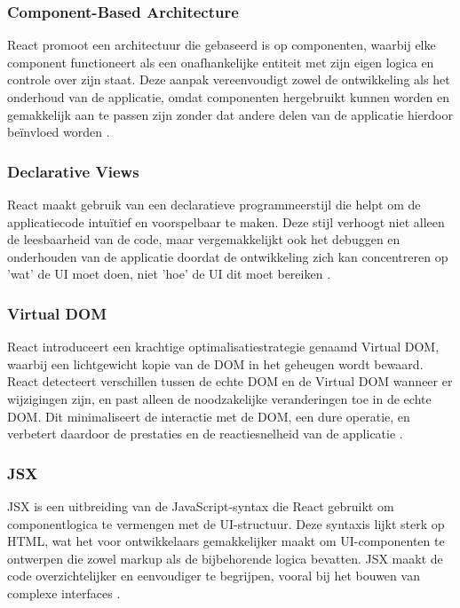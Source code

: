 \subsubsection{Component-Based Architecture}
React promoot een architectuur die gebaseerd is op componenten, waarbij elke component functioneert als een onafhankelijke entiteit met zijn eigen logica en controle over zijn staat. Deze aanpak vereenvoudigt zowel de ontwikkeling als het onderhoud van de applicatie, omdat componenten hergebruikt kunnen worden en gemakkelijk aan te passen zijn zonder dat andere delen van de applicatie hierdoor beïnvloed worden \autocite{React2024}.

\subsubsection{Declarative Views}
React maakt gebruik van een declaratieve programmeerstijl die helpt om de applicatiecode intuïtief en voorspelbaar te maken. Deze stijl verhoogt niet alleen de leesbaarheid van de code, maar vergemakkelijkt ook het debuggen en onderhouden van de applicatie doordat de ontwikkeling zich kan concentreren op 'wat' de UI moet doen, niet 'hoe' de UI dit moet bereiken \autocite{React2024}.

\subsubsection{Virtual DOM}
React introduceert een krachtige optimalisatiestrategie genaamd Virtual DOM, waarbij een lichtgewicht kopie van de DOM in het geheugen wordt bewaard. React detecteert verschillen tussen de echte DOM en de Virtual DOM wanneer er wijzigingen zijn, en past alleen de noodzakelijke veranderingen toe in de echte DOM. Dit minimaliseert de interactie met de DOM, een dure operatie, en verbetert daardoor de prestaties en de reactiesnelheid van de applicatie \autocite{React2024}.

\subsubsection{JSX}
JSX is een uitbreiding van de JavaScript-syntax die React gebruikt om componentlogica te vermengen met de UI-structuur. Deze syntaxis lijkt sterk op HTML, wat het voor ontwikkelaars gemakkelijker maakt om UI-componenten te ontwerpen die zowel markup als de bijbehorende logica bevatten. JSX maakt de code overzichtelijker en eenvoudiger te begrijpen, vooral bij het bouwen van complexe interfaces \autocite{React2024}.

